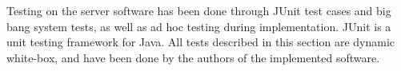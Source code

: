 Testing on the server software has been done through JUnit test cases and big bang system tests, as well as ad hoc testing during implementation.
JUnit is a unit testing framework for Java\cite{JUnit}. All tests described in this section are dynamic white-box, and have been done by the authors of the implemented software.


